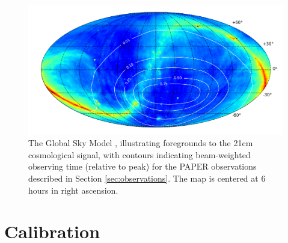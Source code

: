 \documentclass[twocolumn,numberedappendix]{emulateapj} \shorttitle{PSA64}
\begin{document}
\begin{figure}[!t]\centering
\includegraphics[width=2\columnwidth,height=\columnwidth]{plots/coverage.png}
\caption{The Global Sky Model \citep{deoliveira2008}, illustrating foregrounds to the 21cm
cosmological signal, with 
contours indicating beam-weighted observing time (relative to peak) for the PAPER observations
described in Section \ref{sec:observations}.  The map is centered at 6 hours in right ascension.
}\label{fig:coverage}
\end{figure}


\section{Calibration}\label{sec:calib}
\end{document}
